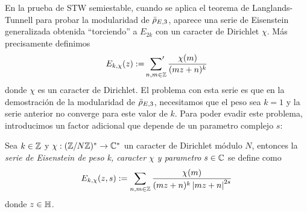 \documentclass[../../tesis_maestria]{subfiles}
\begin{document}
%




En la prueba de STW semiestable, cuando se aplica el teorema de Langlands-Tunnell para probar la
modularidad de $\bar{\rho}_{E,3}$, aparece una serie de Eisenstein generalizada obtenida ``torciendo'' a $E_{2k}$
con un caracter de Dirichlet $\chi$. M\'as precisamente definimos
\[
  E_{k,\chi}(z):=\sideset{}{'}\sum_{n,m\in\mathbb{Z}}\frac{\chi(m)}{(mz+n)^k}
\]
donde $\chi$ es un caracter de Dirichlet.
El problema con esta serie es que en la demostraci\'on de la modularidad de $\bar{\rho}_{E,3}$, necesitamos
que el peso sea $k=1$ y la serie anterior no converge para este valor de $k$. Para poder evadir
este problema, introducimos un factor adicional que depende de un parametro complejo $s$:

\begin{defin}%
  Sea $k\in\mathbb{Z}$ y $\chi:(\mathbb{Z}/N\mathbb{Z})^*\rightarrow\mathbb{C}^*$ un caracter de Dirichlet m\'odulo $N$,
  entonces la \emph{serie de Eisenstein de peso k, caracter $\chi$ y parametro} $s\in\mathbb{C}$ se define como
  \[
    E_{k,\chi}(z,s):=\sum_{n,m\in\mathbb{Z}}\frac{\chi(m)}{(mz+n)^{k}\left| mz+n \right|^{2s}}
  \]
  donde $z\in\mathbb{H}$.
\end{defin}%
\end{document}
